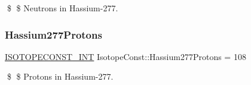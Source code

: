 \$ \$ Neutrons in Hassium-\/277. \mbox{\label{group___isotope_const-_hassium-_hs277_gaad6fe30dbd9a453ada6d915eb05df3e8}} 
\subsubsection{\texorpdfstring{Hassium277\+Protons}{Hassium277Protons}}
{\footnotesize\ttfamily \mbox{\hyperlink{group___isotope_const-_macros_ga5f18360b3e99483a35c32d789e62621c}{I\+S\+O\+T\+O\+P\+E\+C\+O\+N\+S\+T\+\_\+\+I\+NT}} Isotope\+Const\+::\+Hassium277\+Protons = 108}

\$ \$ Protons in Hassium-\/277. 